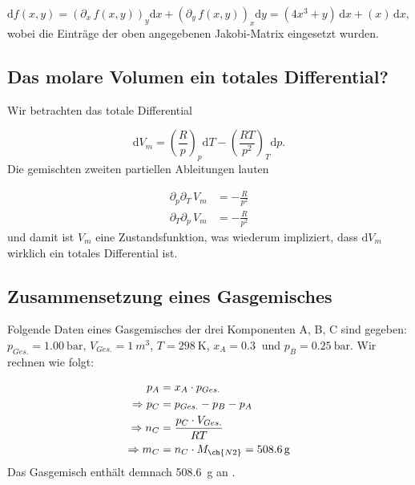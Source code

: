       \begin{equation}
        \text{d} f(x,y) = \left(\partial_{x} \, f(x,y)\right)_y \text{d} x + \left(\partial_{y} \, f(x,y)\right)_x \text{d} y = \left(4x^3 + y\right) \, \text{d} x + \left(x\right) \, \text{d} x,
      \end{equation}
    wobei die Einträge der oben angegebenen Jakobi-Matrix eingesetzt wurden.
    
  \subsection{Das molare Volumen ein totales Differential?}
  
    Wir betrachten das totale Differential
    
      \begin{equation}
        \text{d} V_m = \left(\frac{R}{p}\right)_p \text{d} T - \left(\frac{RT}{p^2}\right)_T \text{d}p.
      \end{equation}
    Die gemischten zweiten partiellen Ableitungen lauten
    
      \begin{equation}
        \begin{split}
          \partial_{p}\partial_{T} \, V_m &= -\frac{R}{p^2} \\
          \partial_{T}\partial_{p} \, V_m &= -\frac{R}{p^2}
        \end{split}
      \end{equation}
    und damit ist $V_m$ eine Zustandsfunktion, was wiederum impliziert, dass $\text{d} V_m$ wirklich ein totales Differential ist.
    
  \subsection{Zusammensetzung eines Gasgemisches}
  
    Folgende Daten eines Gasgemisches der drei Komponenten A, B, C sind gegeben: $p_{Ges.} = \SI[mode=text]{1.00}{\bar}$, $V_{Ges.} = \SI[mode=text]{1}{m^3}$, $T = \SI[mode=text]{298}{\kelvin}$, $x_A = \SI[mode=text]{0.3}{}$ und $p_B = \SI[mode=text]{0.25}{\bar}$. Wir rechnen wie folgt:
    
    \begin{equation}
      \begin{split}
        p_A &= x_A \cdot p_{Ges.} \\
        \Rightarrow p_C &= p_{Ges.} - p_B - p_A \\
        \Rightarrow n_C &= \frac{p_C \cdot V_{Ges.}}{RT} \\
        \Rightarrow m_C &= n_C \cdot M_{\ch{N2}} = \SI[mode=text]{508.6}{\gram}
      \end{split}
    \end{equation}
    Das Gasgemisch enthält demnach \SI[mode=text]{508.6}{\gram} an .